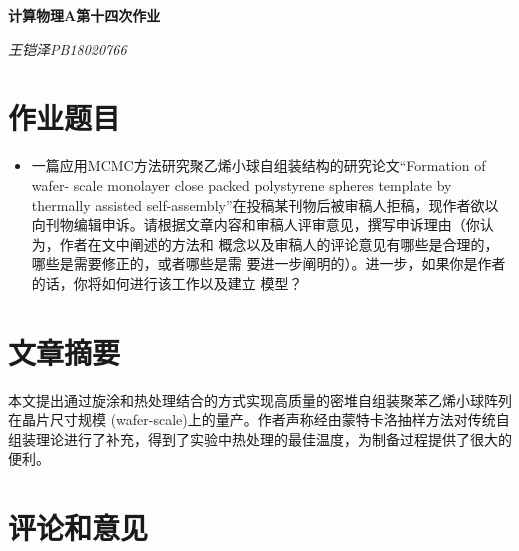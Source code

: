 \documentclass[UTF8]{ctexart}
\begin{document}
	\centering\textbf{\LARGE{计算物理A第十四次作业}}
	
	\textit{王铠泽\qquad PB18020766}
	
		
	\section{作业题目}
	
	\begin{itemize}
	\item	一篇应用MCMC方法研究聚乙烯小球自组装结构的研究论文“Formation of wafer-
	scale monolayer close packed polystyrene spheres template by thermally assisted self-assembly”在投稿某刊物后被审稿人拒稿，现作者欲以向刊物编辑申诉。请根据文章内容和审稿人评审意见，撰写申诉理由（你认为，作者在文中阐述的方法和
	概念以及审稿人的评论意见有哪些是合理的，哪些是需要修正的，或者哪些是需
	要进一步阐明的）。进一步，如果你是作者的话，你将如何进行该工作以及建立
	模型？
	\end{itemize}

	\section{文章摘要}
	
	\begin{flushleft}
		本文提出通过旋涂和热处理结合的方式实现高质量的密堆自组装聚苯乙烯小球阵列在晶片尺寸规模 (wafer-scale)上的量产。作者声称经由蒙特卡洛抽样方法对传统自组装理论进行了补充，得到了实验中热处理的最佳温度，为制备过程提供了很大的便利。
	\end{flushleft}
	
	\section{评论和意见}
	
\end{document}
